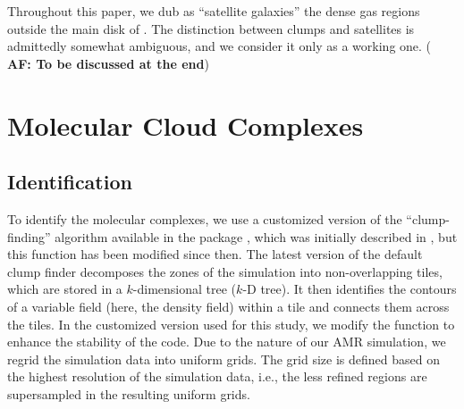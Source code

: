 \IfFileExists{emulateapjlegacy.cls}{\documentclass[iop]{emulateapjlegacy}}{\documentclass[iop]{emulateapj}}
\newcommand{\AF}[1]{({\bf \color{afcolor} AF: #1})}
\begin{document}
Throughout this paper, we dub as ``satellite galaxies'' the dense gas regions outside the main disk of \flower. The distinction between clumps and satellites is admittedly somewhat ambiguous, and we consider it only as a working one.
\AF{To be discussed at the end}

\section{Molecular Cloud Complexes}\label{sec:eqn}

\subsection{Identification}\label{sec:method}

To identify the molecular complexes, we use a customized version of the ``clump-finding'' algorithm available in the  package  \citep{Turk11a}, which was initially described in \citet{Smith09a}, but this function has been modified since then.
%
The latest version of the default  clump finder decomposes the zones of the simulation into non-overlapping tiles, which are stored in a $k$-dimensional tree ($k$-D tree). It then identifies the contours of a variable field (here, the density field) within a tile and connects them across the tiles. In the customized version used for this study, we modify the function to enhance the stability of the code.
%
Due to the nature of our AMR simulation, we regrid the simulation data into uniform grids. The grid size is defined based on the highest resolution of the simulation data, i.e., the less refined regions are supersampled in the resulting uniform grids.
\end{document}
